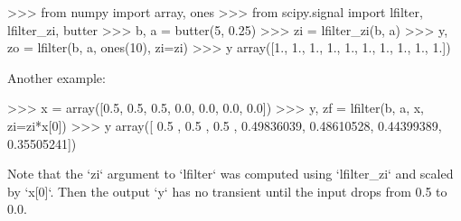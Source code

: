 \begin{DoxyVerb}
>>> from numpy import array, ones
>>> from scipy.signal import lfilter, lfilter_zi, butter
>>> b, a = butter(5, 0.25)
>>> zi = lfilter_zi(b, a)
>>> y, zo = lfilter(b, a, ones(10), zi=zi)
>>> y
array([1.,  1.,  1.,  1.,  1.,  1.,  1.,  1.,  1.,  1.])

Another example:

>>> x = array([0.5, 0.5, 0.5, 0.0, 0.0, 0.0, 0.0])
>>> y, zf = lfilter(b, a, x, zi=zi*x[0])
>>> y
array([ 0.5       ,  0.5       ,  0.5       ,  0.49836039,  0.48610528,
    0.44399389,  0.35505241])

Note that the `zi` argument to `lfilter` was computed using
`lfilter_zi` and scaled by `x[0]`.  Then the output `y` has no
transient until the input drops from 0.5 to 0.0.\end{DoxyVerb}
 \hypertarget{namespacescipy_1_1signal_1_1signaltools_a150dbc1e54a79c247cc7cd3cf4629605}{}
